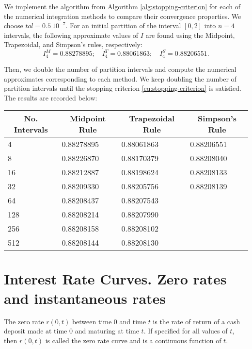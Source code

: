 We implement the algorithm from Algorithm \ref{alg:stopping-criterion} for each
    of the numerical integration methods to compare their convergence
    properties.
We choose $ tol = 0.5\ 10^{-7} $.
For an initial partition of the interval $ [0, 2] $ into $ n = 4 $ intervals,
    the following approximate values of $ I $ are found using the Midpoint,
    Trapezoidal, and Simpson's rules, respectively:
\begin{equation*}
    I_4^M = 0.88278895;\quad I_4^T = 0.88061863;\quad I_4^S = 0.88206551.
\end{equation*}

Then, we double the number of partition intervals and compute the numerical
    approximates corresponding to each method.
We keep doubling the number of partition intervals until the stopping criterion
    \eqref{eq:stopping-criterion} is satisfied.
The results are recorded below:
\begin{table}
    \center
    \begin{tabular}[c]{l|l|l|l}
        \hline
        \multicolumn{1}{c|}{No. Intervals} &
        \multicolumn{1}{c}{Midpoint Rule} &
        \multicolumn{1}{c}{Trapezoidal Rule} &
        \multicolumn{1}{c}{Simpson's Rule} \\
        \hline
        4 & 0.88278895 & 0.88061863 & 0.88206551 \\
        8 & 0.88226870 & 0.88170379 & 0.88208040 \\
        16 & 0.88212887 & 0.88198624 & 0.88208133 \\
        32 & 0.88209330 & 0.88205756 & 0.88208139 \\
        64 & 0.88208437 & 0.88207543 & \\
        128 & 0.88208214 & 0.88207990 & \\
        256 & 0.88208158 & 0.88208102 & \\
        512 & 0.88208144 & 0.88208130 & \\
        \hline
    \end{tabular}
\end{table}

\section{Interest Rate Curves. Zero rates and instantaneous rates}
The zero rate $ r(0, t) $ between time 0 and time $ t $ is the rate of return
    of a cash deposit made at time 0 and maturing at time $ t $.
If specified for all values of $ t $, then $ r(0, t) $ is called the zero rate
    curve and is a continuous function of $ t $.


